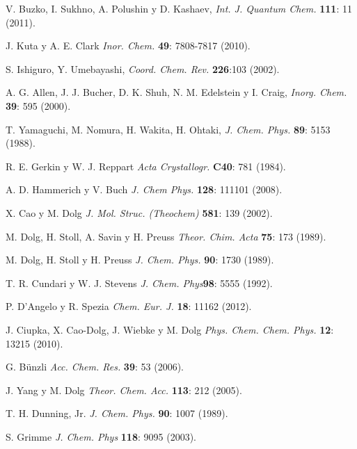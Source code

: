 
\begin{thebibliography}{XXX}

 V. Buzko, I. Sukhno, A. Polushin y D. Kashaev, 
{\em Int. J. Quantum Chem.} {\bf 111}: 11  (2011).

 J. Kuta y A. E. Clark {\em Inor. Chem.} {\bf 49}: 
7808-7817 (2010).

 S. Ishiguro, Y. Umebayashi, {\em Coord. Chem. Rev.}
{\bf 226}:103 (2002).

 A. G. Allen, J. J. Bucher, D. K. Shuh, N. M. Edelstein y I. Craig, 
{\em Inorg. Chem.} {\bf 39}: 595 (2000).

 T. Yamaguchi, M. Nomura, H. Wakita, H. Ohtaki, 
{\em J. Chem. Phys.} {\bf 89}: 5153 (1988).

 R. E. Gerkin y W. J. Reppart {\em Acta Crystallogr.} {\bf C40}: 781 (1984).
 
 A. D. Hammerich y V. Buch {\em J. Chem Phys.} 
{\bf 128}: 111101 (2008).

 X. Cao y M. Dolg {\em J. Mol. Struc. (Theochem)} 
{\bf 581}: 139 (2002).

 M. Dolg, H. Stoll, A. Savin y H. Preuss {\em 
Theor. Chim. Acta} {\bf 75}: 173 (1989).

 M. Dolg, H. Stoll y H. Preuss {\em J. Chem. 
Phys.} {\bf 90}: 1730 (1989).

 T. R. Cundari y W. J. Stevens {\em J. Chem. 
Phys}{\bf 98}: 5555 (1992).

 P. D'Angelo y R. Spezia {\em  Chem. Eur. J.}
{\bf 18}: 11162 (2012).

 J. Ciupka, X. Cao-Dolg, J. Wiebke y M. Dolg 
{\em  Phys. Chem. Chem. Phys.} {\bf 12}: 13215 (2010).

 G. B\"unzli {\em Acc. Chem. Res. } {\bf 39}: 
53 (2006).

 J. Yang y M. Dolg {\em Theor. Chem. Acc.} 
{\bf 113}: 212 (2005).

 T. H. Dunning, Jr. {\em J. Chem. Phys.} 
{\bf 90}: 1007 (1989).

 S. Grimme {\em J. Chem. Phys} {\bf 118}: 9095 
(2003).

\end{thebibliography}
